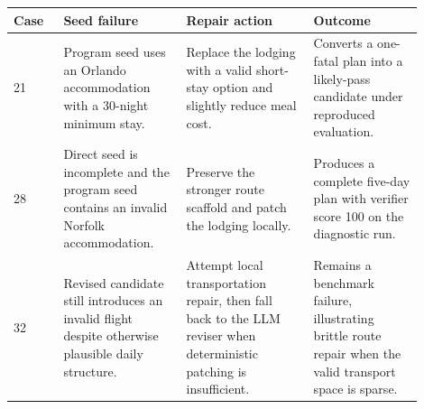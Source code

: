 \begin{tabular}{@{}p{0.11\linewidth}p{0.27\linewidth}p{0.28\linewidth}p{0.24\linewidth}@{}}
\toprule
Case & Seed failure & Repair action & Outcome \\
\midrule
21 & Program seed uses an Orlando accommodation with a 30-night minimum stay. & Replace the lodging with a valid short-stay option and slightly reduce meal cost. & Converts a one-fatal plan into a likely-pass candidate under reproduced evaluation. \\
28 & Direct seed is incomplete and the program seed contains an invalid Norfolk accommodation. & Preserve the stronger route scaffold and patch the lodging locally. & Produces a complete five-day plan with verifier score 100 on the diagnostic run. \\
32 & Revised candidate still introduces an invalid flight despite otherwise plausible daily structure. & Attempt local transportation repair, then fall back to the LLM reviser when deterministic patching is insufficient. & Remains a benchmark failure, illustrating brittle route repair when the valid transport space is sparse. \\
\bottomrule
\end{tabular}
